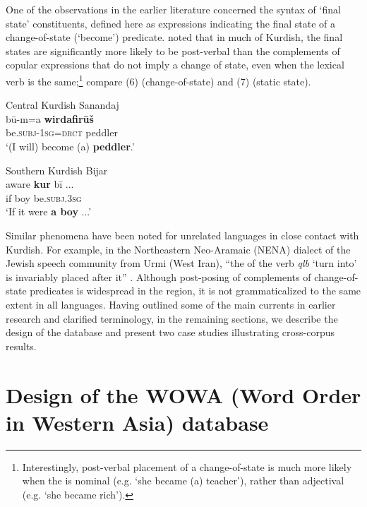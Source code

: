 \documentclass[output=paper,colorlinks,citecolor=brown,collectionchapter]{langscibook}
\begin{document}
One of the observations in the earlier literature concerned the syntax of `final state' constituents, defined here as expressions indicating the final state of a change-of-state (`become') predicate. \citet{haig_western_2017,Haig2022PostPredicateCon} noted that in much of Kurdish, the final states are significantly more likely to be post-verbal than the complements of copular expressions that do not imply a change of state, even when the lexical verb is the same;\footnote{Interestingly, post-verbal placement of a change-of-state  is much more likely when the  is nominal (e.g. `she became (a) teacher'), rather than adjectival (e.g. `she became rich').} compare (6) (change-of-state) and (7) (static state).

\ea\label{Intro:ex:6} 
Central Kurdish Sanandaj \citep[I, 1016]{mohammadirad_Sanandaj_Kurdish_2022} \\
\gll bū-m=a \textbf{wirdafirūš} \\
be\textsc{.subj-1sg=drct} peddler \\
\glt `(I will) become (a) \textbf{peddler}.'
\z

\ea\label{Intro:ex:7} 
Southern Kurdish Bijar \citep[D, 0282]{mohammadirad_Bijar_Kurdish_2022} \\
\gll aware \textbf{kur} bī ... \\
if boy be\textsc{.subj.3sg} \\
\glt `If it were \textbf{a boy} ...'
\z

Similar phenomena have been noted for unrelated  languages in close contact with Kurdish. For example, in the Northeastern Neo-Aramaic (NENA) dialect of the Jewish speech community from Urmi (West Iran), ``the  of the verb \textit{qlb} `turn into' is invariably placed after it'' \citep[323]{Khan2008JUrmi}. Although post-posing of complements of change-of-state predicates is widespread in the region, it is not grammaticalized to the same extent in all languages. Having outlined some of the main currents in earlier research and clarified terminology, in the remaining sections, we describe the design of the database and present two case studies illustrating cross-corpus results.

\section{Design of the WOWA (Word Order in Western Asia) database}\label{Intro:ss:3}
\end{document}
